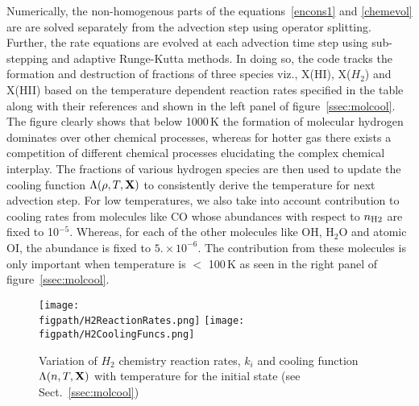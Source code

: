 \documentclass[useAMS,usenatbib,letters]{mn2e}
\newcommand{\figpath}{PFIGS/}
\begin{document}
Numerically, the
non-homogenous parts of the equations~\ref{encons1} and \ref{chemevol} 
are are solved separately from the advection step
using operator splitting. Further, the rate equations are evolved at each advection time
step using sub-stepping and adaptive Runge-Kutta methods.
In doing so, the code tracks the formation and destruction of
fractions of three species viz., X(HI), X($H_{2}$)
and X(HII) based on the temperature dependent reaction rates specified
in the table along with their references and shown in the left panel
of figure~\ref{ssec:molcool}. The figure clearly shows that below
1000\,K the formation of molecular hydrogen dominates over other
chemical processes, whereas for hotter gas there exists a competition
of different chemical processes elucidating the complex chemical interplay.
The fractions of various hydrogen species are then used to update the cooling
function $\Lambda(\rho,T,{\bf{X}})$ to consistently derive the
temperature for next advection step. For low temperatures, we also
take into account contribution to cooling rates from molecules like
CO whose abundances with respect to $n_{\rm H2}$ are fixed to
10$^{-5}$. Whereas, for each of the other molecules like OH, H$_{2}$O and atomic OI,
the abundance is fixed to $5.\times10^{-6}$. The contribution from
these molecules is only important when temperature is $<$ 100\,K as seen
in the right panel of figure~\ref{ssec:molcool}. 



\begin{figure*}
 \texttt{[image: \\figpath/H2ReactionRates.png]}
 \texttt{[image: \\figpath/H2CoolingFuncs.png]}
 \caption{Variation of $H_2$ chemistry reaction rates, $k_{i}$ and cooling
   function $\Lambda(n,T,{\bf{X}})$ with temperature for the initial
   state (see Sect.~\ref{ssec:molcool})}
\label{fig:tempvar}
\end{figure*}
\end{document}

